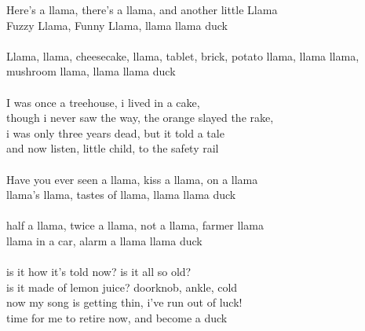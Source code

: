 \vspace{10pt}
Here's a llama, there's a llama, and another little Llama\\
Fuzzy Llama, Funny Llama, llama llama duck\\
\\
Llama, llama, cheesecake, llama, tablet, brick, potato llama, llama llama, mushroom llama, llama llama duck\\
\\
I was once a treehouse, i lived in a cake,\\
though i never saw the way, the orange slayed the rake,\\
i was only three years dead, but it told a tale\\
and now listen, little child, to the safety rail\\
\\
Have you ever seen a llama, kiss a llama, on a llama\\
llama's llama, tastes of llama, llama llama duck\\
\\
half a llama, twice a llama, not a llama, farmer llama\\
llama in a car, alarm a llama llama duck\\
\\
is it how it's told now? is it all so old?\\
is it made of lemon juice? doorknob, ankle, cold\\
now my song is getting thin, i've run out of luck!\\
time for me to retire now, and become a duck
